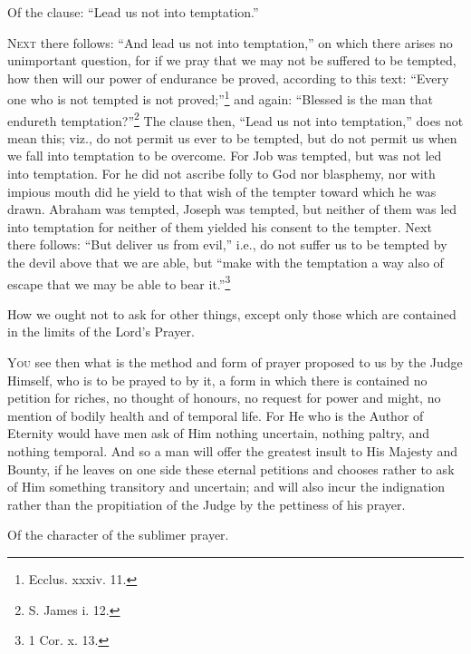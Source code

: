 
Of the clause: “Lead us not into temptation.”

\textsc{Next} there follows: “And lead us not into temptation,” on which there arises no unimportant question, for if we pray that we may not be suffered to be tempted, how then will our power of endurance be proved, according to this text: “Every one who is not tempted is not proved;”\footnote{Ecclus. xxxiv. 11.} and again: “Blessed is the man that endureth temptation?”\footnote{S. James i. 12.} The clause then, “Lead us not into temptation,” does not mean this; viz., do not permit us ever to be tempted, but do not permit us when we fall into temptation to be overcome. For Job was tempted, but was not led into temptation. For he did not ascribe folly to God nor blasphemy, nor with impious mouth did he yield to that wish of the tempter toward which he was drawn. Abraham was tempted, Joseph was tempted, but neither of them was led into temptation for neither of them yielded his consent to the tempter. Next there follows: “But deliver us from evil,” i.e., do not suffer us to be tempted by the devil above that we are able, but “make with the temptation a way also of escape that we may be able to bear it.”\footnote{1 Cor. x. 13.}


How we ought not to ask for other things, except only those which are contained in the limits of the Lord’s Prayer.

\textsc{You} see then what is the method and form of prayer proposed to us by the Judge Himself, who is to be prayed to by it, a form in which there is contained no petition for riches, no thought of honours, no request for power and might, no mention of bodily health and of temporal life. For He who is the Author of Eternity would have men ask of Him nothing uncertain, nothing paltry, and nothing temporal. And so a man will offer the greatest insult to His Majesty and Bounty, if he leaves on one side these eternal petitions and chooses rather to ask of Him something transitory and uncertain; and will also incur the indignation rather than the propitiation of the Judge by the pettiness of his prayer.


Of the character of the sublimer prayer.


